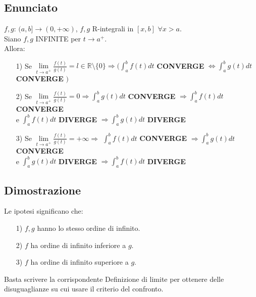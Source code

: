\documentclass{article}
\newcommand{\R}{\mathbb{R}}
\begin{document}
\begin{flushleft}
\subsection{Enunciato}
$f, g$: $(a,b] \rightarrow (0, +\infty)$, $f, g$ R-integrali in $[x,b]$ $\forall x > a$.\\
Siano $f, g$ INFINITE per $t \to a^+$.\\
Allora:
\begin{enumerate}
\item[1)] Se $\lim\limits_{t \to a^+}\frac{f(t)}{g(t)} = l \in \R \setminus \{0\} \Rightarrow (\int_{a}^{b}f(t)dt$ \textbf{CONVERGE} $ \iff \int_{a}^{b}g(t)dt$ \textbf{CONVERGE} $)$\\
\item[2)] Se $\lim\limits_{t \to a^+}\frac{f(t)}{g(t)} = 0 \Rightarrow $\hspace*{1em}$ \int_{a}^{b}g(t)dt $ \textbf{CONVERGE} $ \Rightarrow \int_{a}^{b}f(t)dt$ \textbf{CONVERGE}\\
\hspace*{8.15em} e $\int_{a}^{b}f(t)dt$ \textbf{DIVERGE} $ \Rightarrow \int_{a}^{b}g(t)dt$ \textbf{DIVERGE}\\
\item[3)] Se $\lim\limits_{t \to a^+}\frac{f(t)}{g(t)} = + \infty \Rightarrow$ \hspace*{1em}$ \int_{a}^{b}f(t)dt$ \textbf{CONVERGE} $\Rightarrow \int_{a}^{b}g(t)dt$ \textbf{CONVERGE}\\
\hspace*{9.93em} e $\int_{a}^{b}g(t)dt$ \textbf{DIVERGE} $\Rightarrow \int_{a}^{b}f(t)dt$ \textbf{DIVERGE}
\end{enumerate}

\subsection{Dimostrazione}
Le ipotesi significano che:
\begin{enumerate}
    \item[1)] $f, g$ hanno lo stesso ordine di infinito.\\
    \item[2)] $f$ ha ordine di infinito inferiore a $g$.\\
    \item[3)] $f$ ha ordine di infinito superiore a $g$.
\end{enumerate}
Basta scrivere la corrispondente Definizione di limite per ottenere delle disuguaglianze su cui usare il criterio del confronto.


\end{flushleft}
\end{document}
